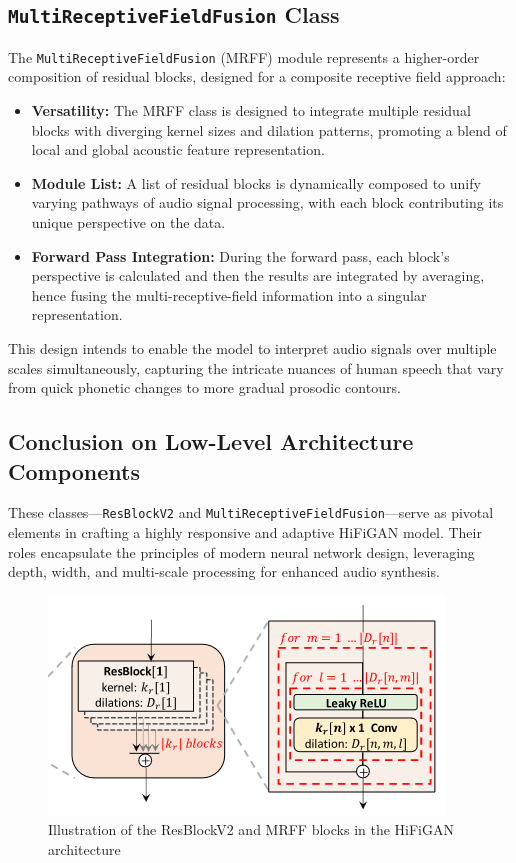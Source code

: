 \documentclass[a4paper]{article}
\begin{document}
\subsection{\texttt{MultiReceptiveFieldFusion} Class}

The \texttt{MultiReceptiveFieldFusion} (MRFF) module represents a higher-order composition of residual blocks, designed for a composite receptive field approach:

\begin{itemize}
  \item \textbf{Versatility:} The MRFF class is designed to integrate multiple residual blocks with diverging kernel sizes and dilation patterns, promoting a blend of local and global acoustic feature representation.
  
  \item \textbf{Module List:} A list of residual blocks is dynamically composed to unify varying pathways of audio signal processing, with each block contributing its unique perspective on the data.
  
  \item \textbf{Forward Pass Integration:} During the forward pass, each block's perspective is calculated and then the results are integrated by averaging, hence fusing the multi-receptive-field information into a singular representation.
\end{itemize}

This design intends to enable the model to interpret audio signals over multiple scales simultaneously, capturing the intricate nuances of human speech that vary from quick phonetic changes to more gradual prosodic contours.

\subsection{Conclusion on Low-Level Architecture Components}

These classes—\texttt{ResBlockV2} and \texttt{MultiReceptiveFieldFusion}—serve as pivotal elements in crafting a highly responsive and adaptive HiFiGAN model. Their roles encapsulate the principles of modern neural network design, leveraging depth, width, and multi-scale processing for enhanced audio synthesis.

\begin{figure}[ht]
  \centering
  \includegraphics[width=0.8\linewidth]{hifigan-blocks.png}
  \caption{Illustration of the ResBlockV2 and MRFF blocks in the HiFiGAN architecture}
  \label{fig:hifigan-blocks}
\end{figure}
\end{document}
